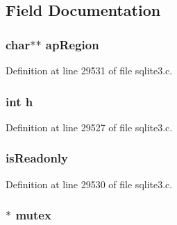 \subsection{Field Documentation}
\hypertarget{structunix_shm_node_a08adddd4e750630785a4a4d069cfbce9}{}
\subsubsection[{ap\+Region}]{\setlength{\rightskip}{0pt plus 5cm}char$\ast$$\ast$ ap\+Region}\label{structunix_shm_node_a08adddd4e750630785a4a4d069cfbce9}


Definition at line 29531 of file sqlite3.\+c.

\hypertarget{structunix_shm_node_a16611451551e3d15916bae723c3f59f7}{}
\subsubsection[{h}]{\setlength{\rightskip}{0pt plus 5cm}int h}\label{structunix_shm_node_a16611451551e3d15916bae723c3f59f7}


Definition at line 29527 of file sqlite3.\+c.

\hypertarget{structunix_shm_node_aad407d6bd887cadd8d87e5ba9797d6b6}{}
\subsubsection[{is\+Readonly}]{ is\+Readonly}\label{structunix_shm_node_aad407d6bd887cadd8d87e5ba9797d6b6}


Definition at line 29530 of file sqlite3.\+c.

\hypertarget{structunix_shm_node_a7bcdded0e06fa908fe1a6df19c3dda21}{}
\subsubsection[{mutex}]{$\ast$ mutex}\label{structunix_shm_node_a7bcdded0e06fa908fe1a6df19c3dda21}


